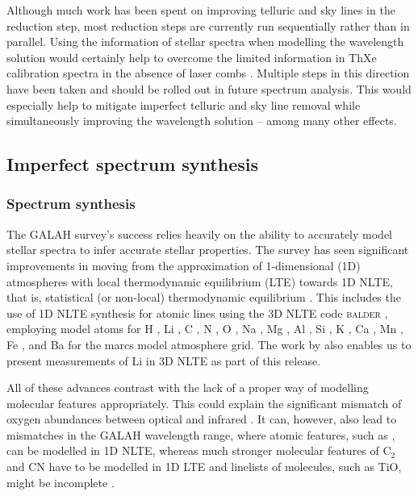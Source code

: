 \documentclass[
  journal=pasa,
  manuscript=research-paper, %
  year=2024,
  volume=37
]{cup-journal}
\newcommand\ion[2]{\text{#1\,\textsc{\lowercase{#2}}}}	%
\begin{document}
Although much work has been spent on improving telluric and sky lines in the reduction step, most reduction steps are currently run sequentially rather than in parallel. Using the information of stellar spectra when modelling the wavelength solution would certainly help to overcome the limited information in ThXe calibration spectra in the absence of laser combs \citep{Kos2018b}. Multiple steps in this direction have been taken \citep{Saydjari2023} and should be rolled out in future spectrum analysis. This would especially help to mitigate imperfect telluric and sky line removal while simultaneously improving the wavelength solution -- among many other effects.

\subsection{Imperfect spectrum synthesis} \label{sec:caveats_synthesis}

\subsubsection{Spectrum synthesis}

The GALAH survey's success relies heavily on the ability to accurately model stellar spectra to infer accurate stellar properties. The survey has seen significant improvements in moving from the approximation of 1-dimensional (1D) atmospheres with local thermodynamic equilibrium (LTE) towards 1D NLTE, that is, statistical (or non-local) thermodynamic equilibrium \citep{Amarsi2020}. This includes the use of 1D NLTE synthesis for atomic lines using the 3D NLTE code \textsc{balder} \citep{Amarsi2018}, employing model atoms for H  \citep{Amarsi2018}, Li \citep{Lind2009, Wang2021}, C \citep{Amarsi2019}, N \citep{Amarsi2020b}, O \citep{Amarsi2018b}, Na \citep{Lind2011}, Mg \citep{Osorio2015}, Al \citep{Nordlander2017}, Si \citep{Amarsi2017}, K \citep{Reggiani2019}, Ca \citep{Osorio2019}, Mn \citep{Bergemann2019b}, Fe \citep{Amarsi2018, Amarsi2022}, and Ba \citep{Gallagher2020} for the {\sc marcs} model atmosphere grid. The work by \citet{Wang2024} also enables us to present measurements of Li in 3D NLTE as part of this release.

All of these advances contrast with the lack of a proper way of modelling molecular features appropriately. This could explain the significant mismatch of oxygen abundances between optical and infrared \citep[compare e.g.][]{Bensby2014, SDSSDR17}. It can, however, also lead to mismatches in the GALAH wavelength range, where atomic features, such as \ion{C}{I}, can be modelled in 1D NLTE, whereas much stronger molecular features of $\mathrm{C}_2$ and CN have to be modelled in 1D LTE and linelists of molecules, such as TiO, might be incomplete \citep{Hoeijmakers2015, McKemmish2019}.
\end{document}
